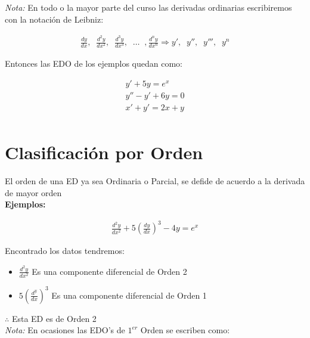 \textit{Nota:} En todo o la mayor parte del curso las derivadas ordinarias escribiremos con la notación de Leibniz:

\begin{equation*}
    \begin{gathered}
        \frac{dy}{dx},\;\;\frac{d^{2}y}{dx^{2}},\;\;\frac{d^{3}y}{dx^{3}},\;\;\ldots\;\;,\frac{d^{n}y}{dx^{n}} \Rightarrow y',\;\;y'',\;\;y''',\;\;y^{n}
    \end{gathered}
\end{equation*}

Entonces las EDO de los ejemplos quedan como:

\begin{equation*}
    \begin{gathered}
        y'+5y=e^{x}\\
        y''-y'+6y=0\\
        x'+y'=2x+y\\
    \end{gathered}
\end{equation*}

\section{Clasificación por Orden}

El orden de una ED ya sea Ordinaria o Parcial, se defide de acuerdo a la derivada de mayor orden\\

\textbf{Ejemplos:}

\begin{equation*}
    \begin{gathered}
        \frac{d^{2}y}{dx^{2}}+5\left(\frac{dy}{dx}\right)^{3}-4y=e^{x}
    \end{gathered}
\end{equation*}

Encontrado los datos tendremos:

\begin{itemize}
  \item \(\displaystyle\frac{d^{2}y}{dx^{2}}\) Es una componente diferencial de Orden 2
  \item \(\displaystyle5\left(\frac{d^y}{dx}\right)^{3}\) Es una componente diferencial de Orden 1
\end{itemize}

\(\displaystyle\therefore\) Esta ED es de Orden 2\\

\textit{Nota:} En ocasiones las EDO's de \(\displaystyle 1^{er}\) Orden se escriben como:

